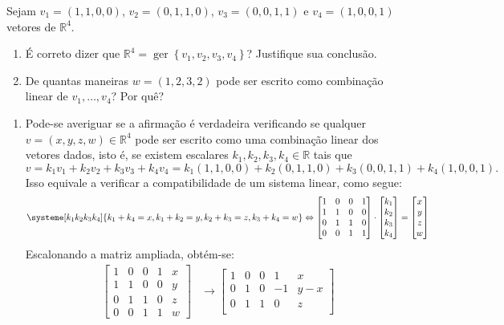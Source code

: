\documentclass[12pt,a4paper]{article}
\newcommand*\ger[1]{\operatorname{ger}\left\{#1\right\}}
\newcommand*\R{\mathbb{R}}
\begin{document}
\begin{ExerciseList}
\Exercise[title={2,5}] Sejam $v_1 = (1,1,0,0)$, $v_2 = (0,1,1,0)$, $v_3 = (0,0,1,1)$ e $v_4 = (1,0,0,1)$ vetores de $\R^4$.
\begin{enumerate}
\item É correto dizer que $\R^4 = \ger{ v_1, v_2, v_3, v_4 }$? Justifique sua conclusão.
\item De quantas maneiras $w = (1,2,3,2)$ pode ser escrito como combinação linear de $v_1, \ldots, v_4$? Por quê?
\end{enumerate}
\Answer
\begin{enumerate}
\item Pode-se averiguar se a afirmação é verdadeira verificando se qualquer $v = (x,y,z,w) \in \R^4$ pode ser escrito como uma combinação linear dos vetores dados, isto é, se existem escalares $k_1, k_2, k_3, k_4 \in \R$ tais que
\[
v = k_1 v_1 + k_2 v_2 +  k_3 v_3 + k_4 v_4
  = k_1 (1,1,0,0)
  + k_2 (0,1,1,0)
  + k_3 (0,0,1,1)
  + k_4 (1,0,0,1).
\]
Isso equivale a verificar a compatibilidade de um sistema linear, como segue:
\[
\systeme[k_1k_2k_3k_4]{
k_1 + k_4 = x,
k_1 + k_2 = y,
k_2 + k_3 = z,
k_3 + k_4 = w
}
\Leftrightarrow
\begin{bmatrix}
1 & 0 & 0 & 1 \\
1 & 1 & 0 & 0 \\
0 & 1 & 1 & 0 \\
0 & 0 & 1 & 1
\end{bmatrix} \cdot
\begin{bmatrix}
k_1\\k_2\\k_3\\k_4
\end{bmatrix}
=
\begin{bmatrix}
x\\y\\z\\w
\end{bmatrix}
\]
Escalonando a matriz ampliada, obtém-se:
\begin{align*}
\begin{bmatrix}
1 & 0 & 0 & 1 & x \\
1 & 1 & 0 & 0 & y \\
0 & 1 & 1 & 0 & z \\
0 & 0 & 1 & 1 & w
\end{bmatrix}
& \rightarrow
\begin{bmatrix}
1 & 0 & 0 & 1 & x \\
0 & 1 & 0 & -1 & y-x \\
0 & 1 & 1 & 0 & z \\

\end{bmatrix}
\end{align*}
\end{enumerate}
\end{ExerciseList}
\end{document}
